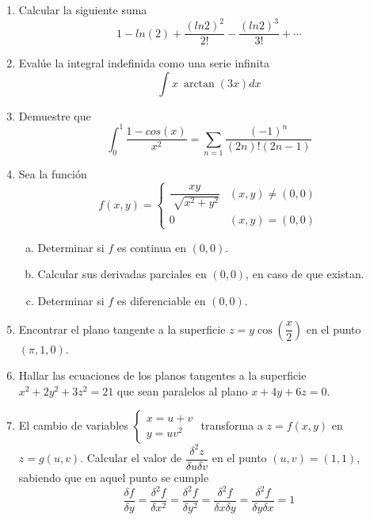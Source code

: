 \documentclass[12pt]{article}
\newenvironment{preguntas}
{\begin{enumerate}\itemsep12pt
	}
	{
	\end{enumerate}
}
\begin{document}
\begin{preguntas}
\item Calcular la siguiente suma
	$$1 - ln(2) + \dfrac{(ln2)^2}{2!}-\dfrac{(ln2)^3}{3!}+\cdots$$
\item Evalúe la integral indefinida como una serie infinita
	$$\int x\ \arctan(3x)dx$$
\item Demuestre que
$$\int_0^1 \dfrac{1-cos(x)}{x^2} = \sum\limits_{n=1} \dfrac{(-1)^n}{(2n)!(2n-1)} $$
\item Sea la función
	$$f(x,y)=
	\begin{cases}
	\dfrac{xy}{\sqrt[]{x^2+y^2}} & (x,y) \neq (0,0)\\
	0 & (x,y)=(0,0)
	\end{cases}
	$$
\begin{enumerate}[a)]
\item Determinar si $f$ es continua en $(0,0)$.
\item Calcular sus derivadas parciales en $(0,0)$, en caso de que existan.
\item Determinar si $f$ es diferenciable en $(0,0)$.
\end{enumerate}
\item Encontrar el plano tangente a la superficie $z = y\cos\left(\dfrac{x}{2}\right)$ en el punto $(\pi, 1, 0)$.
\item Hallar las ecuaciones de los planos tangentes a la superficie $x^2 + 2y^2 + 3z^2 = 21$ que sean paralelos al plano $x + 4y + 6z = 0$.
\item El cambio de variables 
	$\begin{cases}
	x=u+v\\
	y=uv^2
	\end{cases}$
	transforma a $z=f(x,y)$ en $z=g(u,v)$. Calcular el valor de $\dfrac{\delta^2z}{\delta u \delta v}$ en el punto $(u,v) = (1,1)$, sabiendo que en aquel punto se cumple$$\dfrac{\delta f}			{\delta y} = \dfrac{\delta^2 f}{\delta x^2}=\dfrac{\delta^2 f}{\delta y^2}=\dfrac{\delta^2 f}{\delta x \delta y}=\dfrac{\delta^2 f}{\delta y \delta x}=1$$
\end{preguntas}
\end{document}
